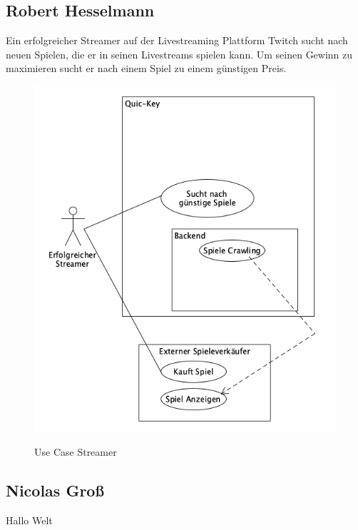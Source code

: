 \subsection*{Robert Hesselmann}

Ein erfolgreicher Streamer auf der Livestreaming Plattform Twitch sucht nach neuen Spielen, die er in seinen Livestreams spielen kann. Um seinen Gewinn zu maximieren sucht er nach einem Spiel zu einem günstigen Preis.

\begin{figure}[hbt]
    \begin{minipage}[t]{.7\textwidth} %
        \caption{Use Case Streamer} %
        \includegraphics[width=1\textwidth]{img/use_case_streamer.png}\\ %
    \end{minipage}
\end{figure}
    

\subsection*{Nicolas Groß}

Hallo Welt








